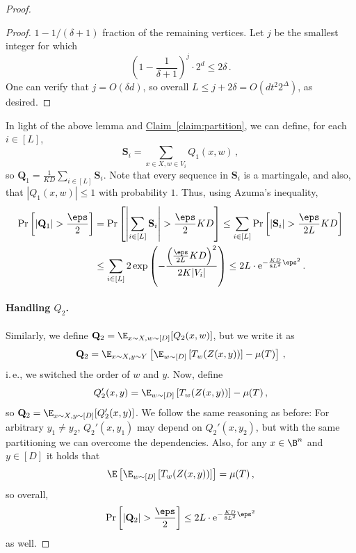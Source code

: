 \documentclass[11pt]{article}
\numberwithin{equation}{section}
\theoremstyle{definition}
\theoremstyle{plain}
\newcommand{\eee}{\mathrm e}
\newcommand{\ie}{i.\,e.}
\newcommand{\expref}[2]{\hyperref[#2]{#1~\ref{#2}}}
\begin{document}
\begin{proof}
\begin{proof}
%
%
$1-1/(\delta+1)$
%
fraction of the remaining vertices.
Let $j$ be the smallest integer for which
\[
\left(1 - \frac{1}{\delta+1} \right)^{j} \cdot 2^{d} \le 2\delta\,.
\]
One can verify that $j = O(\delta d)$, so overall $L \le j+2\delta = O\left(dt^{2}2^{\Delta} \right)$, as desired.
\end{proof}
In light of the above lemma and \expref{Claim}{claim:partition}, we can define, for each $i \in [L]$, 
\[\mathbf{S}_i = \sum_{x\in X,w \in V_i}Q_{1}(x,w)\,,\]
so $\mathbf{Q}_1 = \frac{1}{KD}\sum_{i \in [L]}\mathbf{S}_i$. Note that every sequence in
$\mathbf{S}_i$ is a martingale, and also, that $|Q_{1}(x,w)| \le 1$ with probability $1$. Thus,
using Azuma's inequality,
\begin{align}\label{eq:non-explicit1}
\Pr\left[\left|\mathbf{Q}_1\right| > \frac{\eps}{2}\right] &= \Pr\left[ \left|\sum_{i \in [L]}\mathbf{S}_i\right| > \frac{\eps}{2}KD \right] \le \sum_{i \in [L]}\Pr\left[\left|\mathbf{S}_i\right| > \frac{\eps}{2L}KD\right] \nonumber \\
&\le \sum_{i \in [L]} 2\exp\left( -\frac{\left(\frac{\eps}{2L}KD\right)^2}{2K|V_i|} \right) \le 
2L \cdot \eee^{-\frac{KD}{8L^2}\eps^2}\,.
\end{align}

\paragraph*{Handling $Q_2$.} Similarly, we define
$\mathbf{Q}_2 = \E_{x \sim X,w \sim [D]}[Q_{2}(x,w)]$, but we write it
as 
\[
\mathbf{Q}_2 = \E_{x \sim X,y \sim Y}\left[\E_{w \sim [D]}\left[ T_{w}(Z(x,y)) \right] - \mu(T)\right]\,,
\]
\ie, we switched the order of $w$ and $y$. Now, define
\[
Q_{2}'(x,y) = \E_{w \sim [D]}\left[ T_{w}(Z(x,y)) \right] - \mu(T)\,,
\]
so $\mathbf{Q}_2 = \E_{x \sim X,y \sim [D]}[Q'_{2}(x,y)]$. We follow the same reasoning as before:
For arbitrary $y_1 \neq y_2$, $Q_{2}'(x,y_1)$ may depend on $Q_{2}'(x,y_2)$, but with the same
partitioning we can overcome the dependencies. Also, for any $x \in \B^n$ and $y \in [D]$ 
it holds that
\[
\E\left[ \E_{w \sim [D]}\left[ T_{w}(Z(x,y)) \right] \right] = \mu(T)\,,
\]
so overall,
\begin{equation}\label{eq:non-explicit2}
\Pr\left[\left|\mathbf{Q}_2\right| > \frac{\eps}{2}\right] \le 2L \cdot \eee^{-\frac{KD}{8L^2}\eps^2}
\end{equation}
as well.

%

\end{proof}
\end{document}
